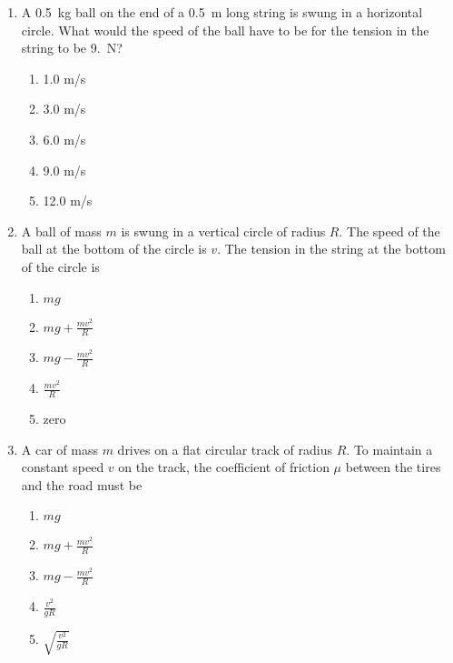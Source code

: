 \documentclass{../../oss-apphys}
\begin{document}
\begin{multicols}{2}
\begin{enumerate}[leftmargin=18pt]
  \item A \SI{.5}{\kg} ball on the end of a \SI{.5}{m} long string is swung in a
    horizontal circle. What would the speed of the ball have to be for the
    tension in the string to be \SI{9.}{\newton}?\\
    \begin{minipage}{0.35\textwidth}
      \begin{enumerate}[noitemsep,topsep=0pt]
      \item 1.0 m/s
      \item 3.0 m/s
      \item 6.0 m/s
      \item 9.0 m/s
      \item 12.0 m/s
      \end{enumerate}
    \end{minipage}
    \begin{minipage}{0.55\textwidth}
    \end{minipage}
    \columnbreak
    
  \item A ball of mass $m$ is swung in a vertical circle of radius $R$. The
    speed of the ball at the bottom of the circle is $v$. The tension in the
    string at the bottom of the circle is
    \begin{enumerate}[noitemsep,topsep=0pt]
    \item $\displaystyle mg$
    \item $\displaystyle mg+\frac{mv^2}{R}$
    \item $\displaystyle mg-\frac{mv^2}{R}$
    \item $\displaystyle \frac{mv^2}{R}$
    \item zero
    \end{enumerate}

  \item A car of mass $m$ drives on a flat circular track of radius $R$. To
    maintain a constant speed $v$ on the track, the coefficient of friction $\mu$
    between the tires and the road must be
    \begin{enumerate}[noitemsep,topsep=0pt]
    \item $\displaystyle mg$
    \item $\displaystyle mg+\frac{mv^2}{R}$
    \item $\displaystyle mg-\frac{mv^2}{R}$
    \item $\displaystyle \frac{v^2}{gR}$
    \item $\displaystyle \sqrt{\frac{v^2}{gR}}$
    \end{enumerate}
    \columnbreak
    

\end{enumerate}
\end{multicols}
\end{document}
